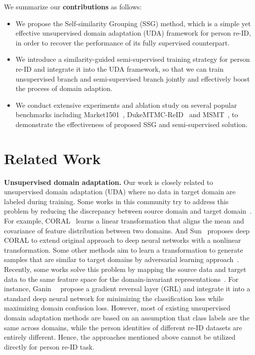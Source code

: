 \documentclass[10pt,twocolumn,letterpaper]{article}
\begin{document}
We summarize our {\bf contributions} as follows:
\begin{itemize}
\item We propose the Self-similarity Grouping (SSG) method, which is a simple yet effective unsupervised domain adaptation (UDA) framework for person re-ID, in order to recover the performance of its fully supervised counterpart.
\item We introduce a similarity-guided semi-supervised training strategy for person re-ID and integrate it into the UDA framework, so that we can train unsupervised branch and semi-supervised branch jointly and effectively boost the process of domain adaption.
\item We conduct extensive experiments and ablation study on several popular benchmarks including Market1501~\cite{zheng2015scalable}, DukeMTMC-ReID~\cite{ristani2016performance,zheng2017unlabeled} and MSMT~\cite{wei2017person}, to demonstrate the effectiveness of proposed SSG and semi-supervised solution.
\end{itemize} \section{Related Work}\label{related}
{\bf Unsupervised domain adaptation.}
Our work is closely related to unsupervised domain adaptation (UDA) where no data in target domain are labeled during training. Some works in this community try to address this problem by reducing the discrepancy between source domain and target domain~\cite{chu2016best,sun2016return,yosinski2014transferable}. For example, CORAL~\cite{sun2016return} learns a linear transformation that aligns the mean and covariance of feature distribution between two domains. And Sun~\cite{sun2016deep} proposes deep CORAL to extend original approach to deep neural networks with a nonlinear transformation. Some other methods aim to learn a transformation to generate samples that are similar to target domains by adversarial learning approach~\cite{bousmalis2017unsupervised,liu2016coupled,isola2017image}. Recently, some works solve this problem by mapping the source data and target data to the same feature space for the domain-invariant representations~\cite{ganin2014unsupervised, ganin2016domain,motiian2017unified,tzeng2015adapting}. For instance, Ganin~\etal~\cite{ganin2014unsupervised} propose a gradient reversal layer (GRL) and integrate it into a standard deep neural network for minimizing the classification loss while maximizing domain confusion loss. However, most of existing unsupervised domain adaptation methods are based on an assumption that class labels are the same across domains, while the person identities of different re-ID datasets are entirely different. Hence, the approaches mentioned above cannot be utilized directly for person re-ID task.
\end{document}

